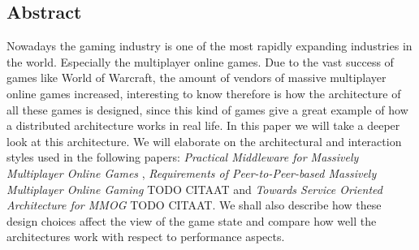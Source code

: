 \begin{center}
\section*{Abstract}
\end{center}
Nowadays the gaming industry is one of the most rapidly expanding industries in the world. Especially the multiplayer online games. Due to the vast success of games like World of Warcraft, the amount of vendors of massive multiplayer online games increased, interesting to know therefore is how the architecture of all these games is designed, since this kind of games give a great example of how a distributed architecture works in real life. In this paper we will take a deeper look at this architecture. We will elaborate on the architectural and interaction styles used in the following papers: \emph{Practical Middleware for Massively Multiplayer Online Games} \cite{middleware}, \emph{Requirements of Peer-to-Peer-based Massively Multiplayer Online Gaming} TODO CITAAT and \emph{Towards Service Oriented Architecture for MMOG} TODO CITAAT. We shall also describe how these design choices affect the view of the game state and compare how well the architectures work with respect to performance aspects.\\
